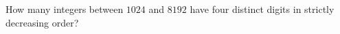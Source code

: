 How many integers between $1024$ and $8192$ have four distinct digits in strictly decreasing order?
